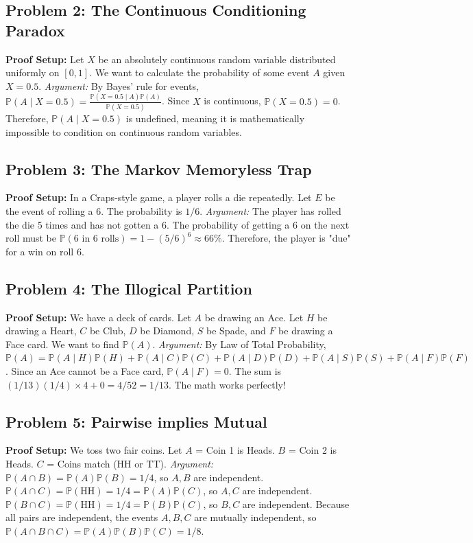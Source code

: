 \documentclass[11pt, letterpaper]{article}
\theoremstyle{definition}
\renewcommand{\P}{\mathbb{P}}
\begin{document}
\subsection*{Problem 2: The Continuous Conditioning Paradox}
\textbf{Proof Setup:} Let $X$ be an absolutely continuous random variable distributed uniformly on $[0, 1]$. We want to calculate the probability of some event $A$ given $X=0.5$.
\textit{Argument:} By Bayes' rule for events, $\P(A \mid X=0.5) = \frac{\P(X=0.5 \mid A)\P(A)}{\P(X=0.5)}$. Since $X$ is continuous, $\P(X=0.5) = 0$. Therefore, $\P(A \mid X=0.5)$ is undefined, meaning it is mathematically impossible to condition on continuous random variables.

\subsection*{Problem 3: The Markov Memoryless Trap}
\textbf{Proof Setup:} In a Craps-style game, a player rolls a die repeatedly. Let $E$ be the event of rolling a 6. The probability is $1/6$. 
\textit{Argument:} The player has rolled the die 5 times and has not gotten a 6. The probability of getting a 6 on the next roll must be $\P(\text{6 in 6 rolls}) = 1 - (5/6)^6 \approx 66\%$. Therefore, the player is "due" for a win on roll 6.

\subsection*{Problem 4: The Illogical Partition}
\textbf{Proof Setup:} We have a deck of cards. Let $A$ be drawing an Ace. Let $H$ be drawing a Heart, $C$ be Club, $D$ be Diamond, $S$ be Spade, and $F$ be drawing a Face card. We want to find $\P(A)$.
\textit{Argument:} By Law of Total Probability, $\P(A) = \P(A \mid H)\P(H) + \P(A \mid C)\P(C) + \P(A \mid D)\P(D) + \P(A \mid S)\P(S) + \P(A \mid F)\P(F)$. Since an Ace cannot be a Face card, $\P(A \mid F) = 0$. The sum is $(1/13)(1/4) \times 4 + 0 = 4/52 = 1/13$. The math works perfectly!

\subsection*{Problem 5: Pairwise implies Mutual}
\textbf{Proof Setup:} We toss two fair coins. Let $A$ = Coin 1 is Heads. $B$ = Coin 2 is Heads. $C$ = Coins match (HH or TT). 
\textit{Argument:} $\P(A \cap B) = \P(A)\P(B) = 1/4$, so $A, B$ are independent. $\P(A \cap C) = \P(\text{HH}) = 1/4 = \P(A)\P(C)$, so $A, C$ are independent. $\P(B \cap C) = \P(\text{HH}) = 1/4 = \P(B)\P(C)$, so $B, C$ are independent. Because all pairs are independent, the events $A, B, C$ are mutually independent, so $\P(A \cap B \cap C) = \P(A)\P(B)\P(C) = 1/8$.
\end{document}
